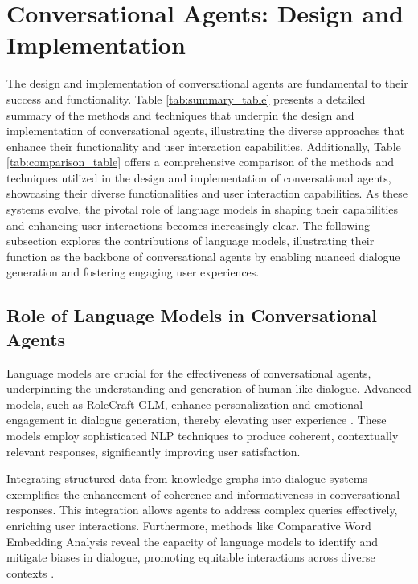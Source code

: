 \section{Conversational Agents: Design and Implementation} \label{sec:Conversational Agents: Design and Implementation}



The design and implementation of conversational agents are fundamental to their success and functionality. Table \ref{tab:summary_table} presents a detailed summary of the methods and techniques that underpin the design and implementation of conversational agents, illustrating the diverse approaches that enhance their functionality and user interaction capabilities. Additionally, Table \ref{tab:comparison_table} offers a comprehensive comparison of the methods and techniques utilized in the design and implementation of conversational agents, showcasing their diverse functionalities and user interaction capabilities. As these systems evolve, the pivotal role of language models in shaping their capabilities and enhancing user interactions becomes increasingly clear. The following subsection explores the contributions of language models, illustrating their function as the backbone of conversational agents by enabling nuanced dialogue generation and fostering engaging user experiences.




\subsection{Role of Language Models in Conversational Agents} \label{subsec:Role of Language Models in Conversational Agents}

Language models are crucial for the effectiveness of conversational agents, underpinning the understanding and generation of human-like dialogue. Advanced models, such as RoleCraft-GLM, enhance personalization and emotional engagement in dialogue generation, thereby elevating user experience \cite{tao2024rolecraftglmadvancingpersonalizedroleplaying}. These models employ sophisticated NLP techniques to produce coherent, contextually relevant responses, significantly improving user satisfaction.

Integrating structured data from knowledge graphs into dialogue systems exemplifies the enhancement of coherence and informativeness in conversational responses. This integration allows agents to address complex queries effectively, enriching user interactions. Furthermore, methods like Comparative Word Embedding Analysis reveal the capacity of language models to identify and mitigate biases in dialogue, promoting equitable interactions across diverse contexts \cite{spinde2021identificationbiasedtermsnews}.

